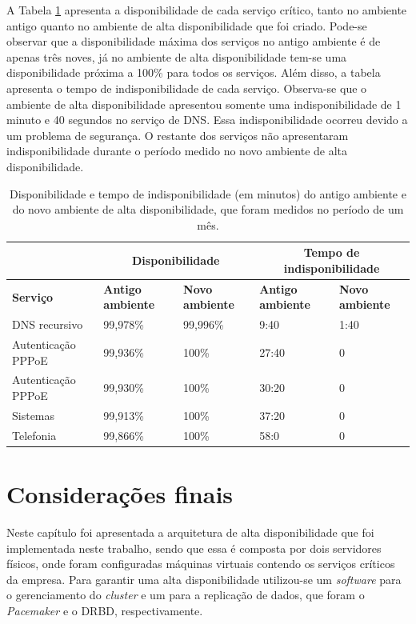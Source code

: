 A Tabela \ref{tab:testefinal} apresenta a disponibilidade de cada serviço crítico, tanto no ambiente antigo quanto 
no ambiente de alta disponibilidade que foi criado. Pode-se observar que a disponibilidade máxima dos serviços no antigo ambiente é de apenas 
três noves, já no ambiente de alta disponibilidade tem-se uma disponibilidade próxima a 100\% para todos os serviços.
Além disso, a tabela apresenta o tempo de indisponibilidade de cada serviço. Observa-se que o ambiente de alta disponibilidade apresentou
somente uma indisponibilidade de 1 minuto e 40 segundos no serviço de \ac{DNS}. Essa indisponibilidade ocorreu devido a um problema de segurança.
O restante dos serviços não apresentaram indisponibilidade durante o período medido no novo ambiente de alta disponibilidade.

\begin{table}[h!]
\caption{Disponibilidade e tempo de indisponibilidade (em minutos) do antigo ambiente e do novo ambiente de alta disponibilidade, que foram medidos no período de um mês.}
\small
\label{tab:testefinal}
\begin{center}
\begin{tabular}{|l|p{2cm}|p{2cm}|p{2cm}|p{2cm}|}\hline
 & \multicolumn{2}{|c|}{\textbf{Disponibilidade}} & \multicolumn{2}{|c|}{\textbf{Tempo de indisponibilidade}} \\\hline
\textbf{Serviço} & \textbf{Antigo ambiente} & \textbf{Novo ambiente} & \textbf{Antigo ambiente} & \textbf{Novo ambiente} \\\hline
DNS recursivo & 99,978\% & 99,996\% & 9:40 & 1:40 \\\hline
Autenticação \ac{PPPoE} & 99,936\% & 100\% & 27:40 & 0 \\\hline
Autenticação \ac{PPPoE} & 99,930\% & 100\% & 30:20 & 0 \\\hline
Sistemas & 99,913\% & 100\% & 37:20 & 0 \\\hline
Telefonia & 99,866\% & 100\% & 58:0 & 0 \\\hline
\end{tabular}
\end{center}
\end{table}


\section{Considerações finais}

Neste capítulo foi apresentada a arquitetura de alta disponibilidade que foi implementada neste trabalho, sendo que essa é composta por dois 
servidores físicos, onde foram configuradas máquinas virtuais contendo os serviços críticos da empresa. Para garantir uma alta disponibilidade
utilizou-se um \textit{software} para o gerenciamento do \textit{cluster} e um para a replicação de dados, que foram o \textit{Pacemaker} e o 
\ac{DRBD}, respectivamente.

